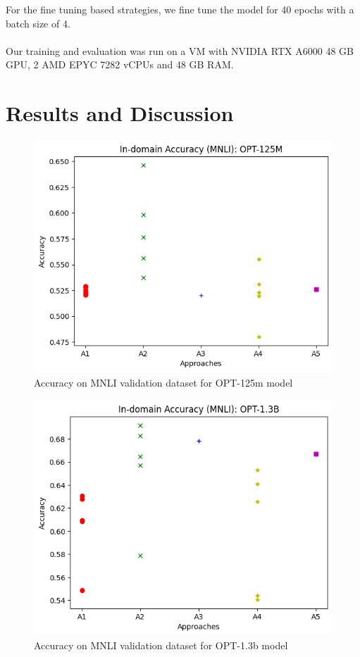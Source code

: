 \documentclass[10pt,twocolumn,letterpaper]{article}
\begin{document}
For the fine tuning based strategies, we fine tune the model for 40 epochs with a batch size of 4.\\\\
Our training and evaluation was run on a VM with NVIDIA RTX A6000 48 GB GPU, 2 AMD EPYC 7282 vCPUs and 48 GB RAM.

\newpage
\section{Results and Discussion}


\begin{figure}[H]
\begin{center}
\includegraphics[width=0.8\linewidth]{figures/opt-125m-accuracy.png}
\end{center}
\caption{Accuracy on MNLI validation dataset for OPT-125m model}
\end{figure}

\begin{figure}[H]
\begin{center}
\includegraphics[width=0.8\linewidth]{figures/opt-1_3b-accuracy.png}
\end{center}
\caption{Accuracy on MNLI validation dataset for OPT-1.3b model}
\end{figure}
\end{document}
